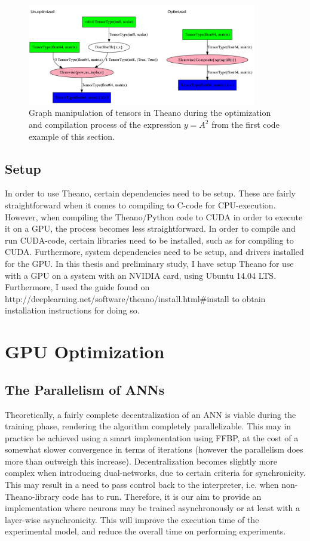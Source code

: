 \begin{figure}
\centering
\includegraphics[width=10cm]{fig/unopt_opt_theano_graph}
\caption{Graph manipulation of tensors in Theano during the optimization and compilation process of the expression $y = A^2$ from the first code example of this section.}
\label{fig:theano_graph_demo}
\end{figure}

\subsection{Setup}

In order to use Theano, certain dependencies need to be setup. These are fairly straightforward when it comes to compiling to C-code for CPU-execution. However, when compiling the Theano/Python code to CUDA in order to execute it on a GPU, the process becomes less straightforward. In order to compile and run CUDA-code, certain libraries need to be installed, such as for compiling to CUDA. Furthermore, system dependencies need to be setup, and drivers installed for the GPU. In this thesis and preliminary study, I have setup Theano for use with a GPU on a system with an NVIDIA card, using Ubuntu 14.04 LTS. Furthermore, I used the guide found on \\http://deeplearning.net/software/theano/install.html\#install to obtain installation instructions for doing so.

\section{GPU Optimization}

\subsection{The Parallelism of ANNs}

Theoretically, a fairly complete decentralization of an ANN is viable during the training phase, rendering the algorithm completely parallelizable. This may in practice be achieved using a smart implementation using FFBP, at the cost of a somewhat slower convergence in terms of iterations (however the parallelism does more than outweigh this increase). Decentralization becomes slightly more complex when introducing dual-networks, due to certain criteria for synchronicity. This may result in a need to pass control back to the interpreter, i.e. when non-Theano-library code has to run. Therefore, it is our aim to provide an implementation where neurons may be trained asynchronously or at least with a layer-wise asynchronicity. This will improve the execution time of the experimental model, and reduce the overall time on performing experiments.

